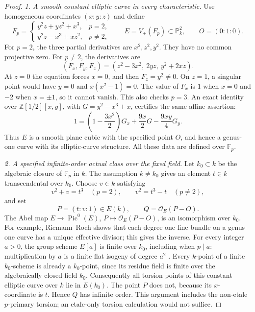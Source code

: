 \begin{proof}
\emph{1. A smooth constant elliptic curve in every characteristic.}
Use homogeneous coordinates $(x:y:z)$ and define
\[
 F_p=
 \begin{cases}
   y^2z+yz^2+x^3,&p=2,\\
   y^2z-x^3+xz^2,&p\ne2,
 \end{cases}
 \qquad
 E=V_+(F_p)\subset\mathbb P^2_k,
 \qquad O=(0:1:0).
\]
For $p=2$, the three partial derivatives are $x^2,z^2,y^2$.
They have no common projective zero. For $p\ne2$, the derivatives
are
\[
 (F_x,F_y,F_z)=(z^2-3x^2,\ 2yz,\ y^2+2xz).
\]
At $z=0$ the equation forces $x=0$, and then $F_z=y^2\ne0$.
On $z=1$, a singular point would have $y=0$ and
$x(x^2-1)=0$. The value of $F_x$ is $1$ when $x=0$ and $-2$
when $x=\pm1$, so it cannot vanish. This also checks $p=3$.
An exact identity over $\mathbb Z[1/2][x,y]$, with
$G=y^2-x^3+x$, certifies the same affine assertion:
\begin{equation}\label{eq:C3x-odd-smoothness}
 1=
 \left(1-\frac{3x^2}{2}\right)G_x
 +\frac{9x}{2}G
 -\frac{9xy}{4}G_y.
\end{equation}
Thus $E$ is a smooth plane cubic with the specified point $O$,
and hence a genus-one curve with its elliptic-curve structure.
All these data are defined over $\mathbb F_p$.

\emph{2. A specified infinite-order actual class over the fixed field.}
Let $k_0\subset k$ be the algebraic closure of $\mathbb F_p$ in $k$.
The assumption $k\ne k_0$ gives an element $t\in k$
transcendental over $k_0$. Choose $v\in k$ satisfying
\[
 v^2+v=t^3\quad(p=2),\qquad
 v^2=t^3-t\quad(p\ne2),
\]
and set
\[
 P=(t:v:1)\in E(k),\qquad Q=\mathcal O_E(P-O).
\]
The Abel map $E\to\operatorname{Pic}^0(E)$, $P\mapsto
\mathcal O_E(P-O)$, is an isomorphism over $k_0$.
For example, Riemann--Roch shows that each degree-one line
bundle on a genus-one curve has a unique effective divisor;
this gives the inverse. For every integer $a>0$, the group
scheme $E[a]$ is finite over $k_0$, including when $p\mid a$:
multiplication by $a$ is a finite flat isogeny of degree $a^2$
\citep[Proposition 8.1 and Theorem 8.2, pp.~12--14]{D_MilneAbelian2022}.
Every $k$-point of a finite $k_0$-scheme is already a $k_0$-point,
since its residue field is finite over the algebraically closed
field $k_0$. Consequently all torsion points of this constant
elliptic curve over $k$ lie in $E(k_0)$. The point $P$ does not,
because its $x$-coordinate is $t$. Hence $Q$ has infinite order.
This argument includes the non-etale $p$-primary torsion; an
etale-only torsion calculation would not suffice.


\end{proof}
